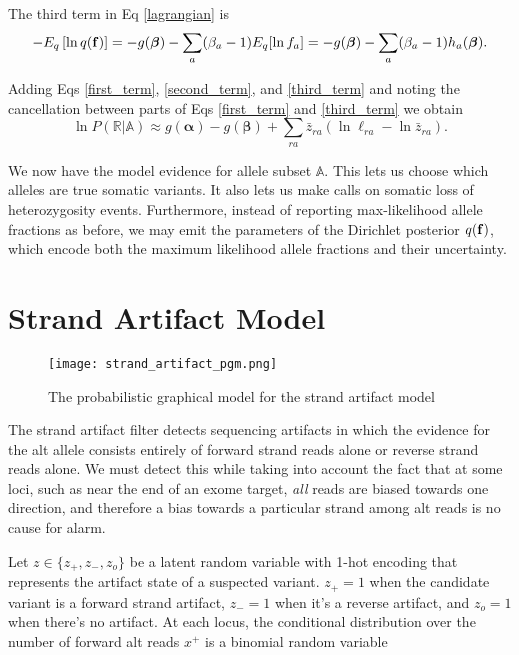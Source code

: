 \documentclass[nofootinbib,amssymb,amsmath]{revtex4}
\newcommand{\vf}{{\bf f}}
\newcommand{\valpha}{{\bm{\alpha}}}
\newcommand{\vbeta}{{\bm{\beta}}}
\begin{document}
The third term in Eq \ref{lagrangian} is
\begin{align}
- E_q \left[ \ln q(\vf) \right] = -g(\vbeta) - \sum_a (\beta_a - 1) E_q [\ln f_a] = -g(\vbeta) - \sum_a (\beta_a - 1) h_a(\vbeta) \label{third_term}.
\end{align}

Adding Eqs \ref{first_term}, \ref{second_term}, and \ref{third_term} and noting the cancellation between parts of Eqs \ref{first_term} and \ref{third_term} we obtain
\begin{equation}
\ln P(\mathbb{R} | \mathbb{A}) \approx g(\valpha) - g(\vbeta) +  \sum_{ra} \bar{z}_{ra} \left( \ln \ell_{ra} - \ln \bar{z}_{ra} \right).
\end{equation}

We now have the model evidence for allele subset $\mathbb{A}$.  This lets us choose which alleles are true somatic variants.  It also lets us make calls on somatic loss of heterozygosity events.  Furthermore, instead of reporting max-likelihood allele fractions as before, we may emit the parameters of the Dirichlet posterior $q(\vf)$, which encode both the maximum likelihood allele fractions and their uncertainty.

\section{Strand Artifact Model}

\begin{figure}
\centering
\texttt{[image: strand\_artifact\_pgm.png]}
\caption{\label{fig:strand artifact}The probabilistic graphical model for the strand artifact model}
\end{figure}

The strand artifact filter detects sequencing artifacts in which the evidence for the alt allele consists entirely of forward strand reads alone or reverse strand reads alone. We must detect this while taking into account the fact that at some loci, such as near the end of an exome target, \emph{all} reads are biased towards one direction, and therefore a bias towards a particular strand among alt reads is no cause for alarm.

Let $z \in \{ z_+, z_-, z_o \}$ be a latent random variable with 1-hot encoding that represents the artifact state of a suspected variant. $z_+ = 1$ when the candidate variant is a forward strand artifact, $z_- = 1$ when it's a reverse artifact, and $z_o = 1$ when there's no artifact. At each locus, the conditional distribution over the number of forward alt reads $x^+$ is a binomial random variable
\end{document}
